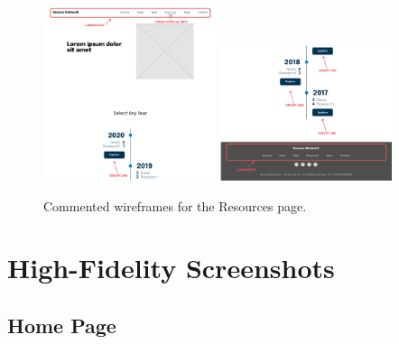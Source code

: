 \documentclass[12pt]{report}
\begin{document}
\begin{figure}[H]
	\centering
	\includegraphics[width=0.45\textwidth]{low_fid_wireframes/all_resources/1.png}
	\includegraphics[width=0.45\textwidth]{low_fid_wireframes/all_resources/2.png}
	\caption{Commented wireframes for the Resources page.}
\end{figure}

\section{High-Fidelity Screenshots}

\subsection{Home Page}
\end{document}
